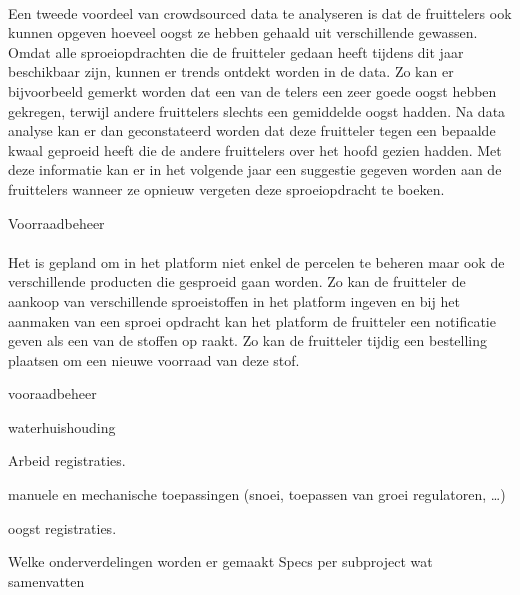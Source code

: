 \paragraph {} Een tweede voordeel van crowdsourced data te analyseren is dat de fruittelers ook
kunnen opgeven hoeveel oogst ze hebben gehaald uit verschillende gewassen. Omdat alle
sproeiopdrachten die de fruitteler gedaan heeft tijdens dit jaar beschikbaar zijn, kunnen er
trends ontdekt worden in de data. Zo kan er bijvoorbeeld gemerkt worden dat een van de
telers een zeer goede oogst hebben gekregen, terwijl andere fruittelers slechts een gemiddelde
oogst hadden. Na data analyse kan er dan geconstateerd worden dat deze fruitteler tegen een
bepaalde kwaal geproeid heeft die de andere fruittelers over het hoofd gezien hadden. Met deze
informatie kan er in het volgende jaar een suggestie gegeven worden aan de fruittelers wanneer
ze opnieuw vergeten deze sproeiopdracht te boeken.

Voorraadbeheer

\paragraph {} Het is gepland om in het platform niet enkel de percelen te beheren maar ook de
verschillende producten die gesproeid gaan worden. Zo kan de fruitteler de aankoop van
verschillende sproeistoffen in het platform ingeven en bij het aanmaken van een sproei
opdracht kan het platform de fruitteler een notificatie geven als een van de stoffen op raakt.
Zo kan de fruitteler tijdig een bestelling plaatsen om een nieuwe voorraad van deze stof.

vooraadbeheer

waterhuishouding

Arbeid registraties.

manuele en mechanische toepassingen (snoei,  toepassen van groei regulatoren, …)

oogst registraties.


Welke onderverdelingen worden er gemaakt
Specs per subproject wat samenvatten


